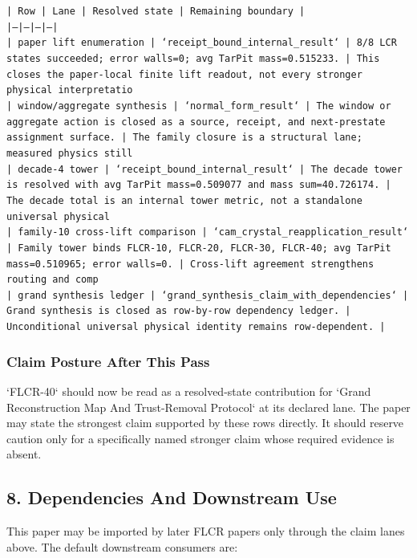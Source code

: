 \documentclass[11pt]{article}
\begin{document}
\noindent\texttt{| Row | Lane | Resolved state | Remaining boundary |}\\
\noindent\texttt{|---|---|---|---|}\\
\noindent\texttt{| paper lift enumeration | `receipt\_bound\_internal\_result` | 8/8 LCR states succeeded; error walls=0; avg TarPit mass=0.515233. | This closes the paper-local finite lift readout, not every stronger physical interpretatio}\\
\noindent\texttt{| window/aggregate synthesis | `normal\_form\_result` | The window or aggregate action is closed as a source, receipt, and next-prestate assignment surface. | The family closure is a structural lane; measured physics still}\\
\noindent\texttt{| decade-4 tower | `receipt\_bound\_internal\_result` | The decade tower is resolved with avg TarPit mass=0.509077 and mass sum=40.726174. | The decade total is an internal tower metric, not a standalone universal physical }\\
\noindent\texttt{| family-10 cross-lift comparison | `cam\_crystal\_reapplication\_result` | Family tower binds FLCR-10, FLCR-20, FLCR-30, FLCR-40; avg TarPit mass=0.510965; error walls=0. | Cross-lift agreement strengthens routing and comp}\\
\noindent\texttt{| grand synthesis ledger | `grand\_synthesis\_claim\_with\_dependencies` | Grand synthesis is closed as row-by-row dependency ledger. | Unconditional universal physical identity remains row-dependent. |}\\

\subsubsection*{Claim Posture After This Pass}

`FLCR-40` should now be read as a resolved-state contribution for `Grand Reconstruction Map And Trust-Removal Protocol` at its declared lane. The paper may state the strongest claim supported by these rows directly. It should reserve caution only for a specifically named stronger claim whose required evidence is absent.

\subsection*{8. Dependencies And Downstream Use}

This paper may be imported by later FLCR papers only through the claim lanes
above. The default downstream consumers are:
\end{document}
